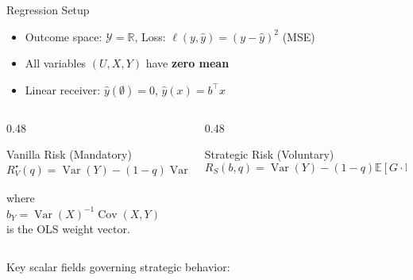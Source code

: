\documentclass[aspectratio=169, 10pt]{beamer}
\newcommand{\R}{\mathbb{R}}
\newcommand{\E}{\mathbb{E}}
\DeclareMathOperator{\Var}{Var}
\DeclareMathOperator{\Cov}{Cov}
\newcommand{\Ind}[1]{\mathbb{I}\{#1\}}
\newcommand{\cY}{\mathcal{Y}}
\begin{document}
\begin{frame}{Regression Setup}
  \begin{itemize}
    \item Outcome space: $\cY = \R$, \quad Loss: $\ell(y, \hat{y}) = (y - \hat{y})^2$ \quad (MSE)
    \item All variables $(U, X, Y)$ have \textbf{zero mean}
    \item Linear receiver: $\hat{y}(\emptyset) = 0$, \quad $\hat{y}(x) = b^\top x$
  \end{itemize}
  \vspace{6pt}
  \begin{columns}[T]
    \begin{column}{0.48\textwidth}
      \begin{block}{Vanilla Risk (Mandatory)}
        \vspace{-4pt}
        $$R_V^\star(q) = \Var(Y) - (1{-}q)\Var(b_Y^\top X)$$
        \vspace{-10pt}
        
        {\small where $b_Y = \Var(X)^{-1}\Cov(X,Y)$ \\ is the OLS weight vector.}
      \end{block}
    \end{column}
    \begin{column}{0.48\textwidth}
      \begin{alertblock}{Strategic Risk (Voluntary)}
        \vspace{-4pt}
        $$R_S(b,q) = \Var(Y) - (1{-}q)\E[G \cdot \Ind{F > 0}]$$
        \vspace{-10pt}
      \end{alertblock}
    \end{column}
  \end{columns}
  \vspace{6pt}
  Key scalar fields governing strategic behavior:
  \begin{center}
  \end{center}
\end{frame}
\end{document}
